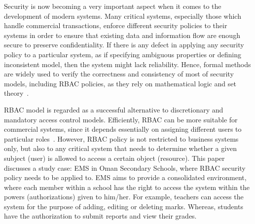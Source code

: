 Security is now becoming a very important aspect when it comes to the development of modern systems. Many critical systems, especially those which handle commercial transactions, enforce different security policies to their systems in order to ensure that existing data and information flow are enough secure to preserve confidentiality. If there is any defect in applying any security policy to a particular system, as if specifying ambiguous properties or defining inconsistent model, then the system might lack reliability. Hence, formal methods are widely used to verify the correctness and consistency of most of security models, including \ac{RBAC} policies, as they rely on mathematical logic and set theory~\cite{DBS2004}.

RBAC model is regarded as a successful alternative to discretionary and mandatory access control models.  Efficiently, \ac{RBAC} can be more suitable for commercial systems, since it depends essentially on assigning different users to particular roles~\cite{FeKu2009}. However, \ac{RBAC} policy is not restricted to business systems only, but also to any critical system that needs to determine whether a given subject (user) is allowed to access a certain object (resource). 
This paper discusses a study case: \ac{EMS} in Oman Secondary Schools, where \ac{RBAC} security policy needs to be applied to.  EMS aims to provide a consolidated environment, where each member within a school has the right to access the system within the powers (authorizations) given to him/her. For example, teachers can access the system for the purpose of adding, editing or deleting marks.  Whereas, students have the authorization to submit reports and view their grades.

